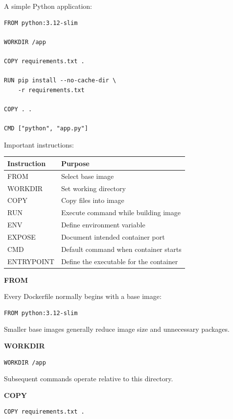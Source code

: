 \documentclass[11pt,letterpaper]{article}
\begin{document}
A simple Python application:

\begin{lstlisting}
FROM python:3.12-slim

WORKDIR /app

COPY requirements.txt .

RUN pip install --no-cache-dir \
    -r requirements.txt

COPY . .

CMD ["python", "app.py"]
\end{lstlisting}

Important instructions:

\begin{center}
\begin{tabularx}{\textwidth}{lX}
\toprule
Instruction & Purpose \\
\midrule
FROM & Select base image \\
WORKDIR & Set working directory \\
COPY & Copy files into image \\
RUN & Execute command while building image \\
ENV & Define environment variable \\
EXPOSE & Document intended container port \\
CMD & Default command when container starts \\
ENTRYPOINT & Define the executable for the container \\
\bottomrule
\end{tabularx}
\end{center}

\textbf{FROM}

Every Dockerfile normally begins with a base image:

\begin{lstlisting}
FROM python:3.12-slim
\end{lstlisting}

Smaller base images generally reduce image size and unnecessary packages.

\textbf{WORKDIR}

\begin{lstlisting}
WORKDIR /app
\end{lstlisting}

Subsequent commands operate relative to this directory.

\textbf{COPY}

\begin{lstlisting}
COPY requirements.txt .
\end{lstlisting}
\end{document}
